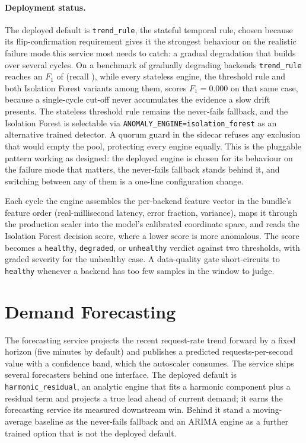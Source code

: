 \paragraph{Deployment status.} The deployed default is \texttt{trend\_rule}, the
stateful temporal rule, chosen because its flip-confirmation requirement gives it
the strongest behaviour on the realistic failure mode this service most needs to
catch: a gradual degradation that builds over several cycles. On a benchmark of
gradually degrading backends \texttt{trend\_rule} reaches an $F_1$ of \BManFone{}
(recall \BManRecall{}), while every stateless engine, the threshold rule and both
Isolation Forest variants among them, scores $F_1 = 0.000$ on that same case,
because a single-cycle cut-off never accumulates the evidence a slow drift
presents. The stateless threshold rule remains the never-fails fallback, and the
Isolation Forest is selectable via \texttt{ANOMALY\_ENGINE=isolation\_forest} as
an alternative trained detector. A quorum guard in the sidecar refuses any
exclusion that would empty the pool, protecting every engine equally. This is the
pluggable pattern working as designed: the deployed engine is chosen for its
behaviour on the failure mode that matters, the never-fails fallback stands behind
it, and switching between any of them is a one-line configuration change.

Each cycle the engine assembles the per-backend feature vector in the bundle's
feature order (real-millisecond latency, error fraction, variance), maps it
through the production scaler into the model's calibrated coordinate space, and
reads the Isolation Forest decision score, where a lower score is more anomalous.
The score becomes a \texttt{healthy}, \texttt{degraded}, or \texttt{unhealthy}
verdict against two thresholds, with graded severity for the unhealthy case. A
data-quality gate short-circuits to \texttt{healthy} whenever a backend has too
few samples in the window to judge.

\section{Demand Forecasting}\label{imb:forecast}

The forecasting service projects the recent request-rate trend forward by a fixed
horizon (five minutes by default) and publishes a predicted requests-per-second
value with a confidence band, which the autoscaler consumes. The service ships
several forecasters behind one interface. The deployed default is
\texttt{harmonic\_residual}, an analytic engine that fits a harmonic component
plus a residual term and projects a true lead ahead of current demand; it earns
the forecasting service its measured downstream win. Behind it stand a
moving-average baseline as the never-fails fallback and an ARIMA engine as a
further trained option that is not the deployed default.


